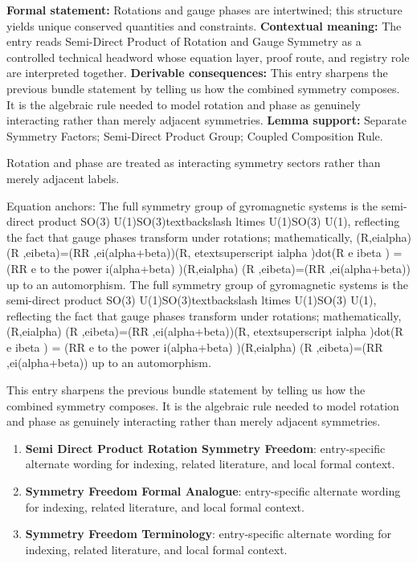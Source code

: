 \begingroup\footnotesize\setlength{\emergencystretch}{3em}\sloppy
\textbf{Formal statement:} Rotations and gauge phases are intertwined; this structure yields unique conserved quantities and constraints. \textbf{Contextual meaning:} The entry reads Semi-Direct Product of Rotation and Gauge Symmetry as a controlled technical headword whose equation layer, proof route, and registry role are interpreted together. \textbf{Derivable consequences:} This entry sharpens the previous bundle statement by telling us how the combined symmetry composes. It is the algebraic rule needed to model rotation and phase as genuinely interacting rather than merely adjacent symmetries. \textbf{Lemma support:} Separate Symmetry Factors; Semi-Direct Product Group; Coupled Composition Rule.\par
\endgroup

Rotation and phase are treated as interacting symmetry sectors rather than merely adjacent labels.

Equation anchors: The full symmetry group of gyromagnetic systems is the semi-direct product SO(3) U(1)SO(3)textbackslash ltimes U(1)SO(3) U(1), reflecting the fact that gauge phases transform under rotations; mathematically, (R,eialpha) (R ,eibeta)=(RR ,ei(alpha+beta))(R, etextsuperscript ialpha )dot(R e ibeta ) = (RR e to the power i(alpha+beta) )(R,eialpha) (R ,eibeta)=(RR ,ei(alpha+beta)) up to an automorphism. The full symmetry group of gyromagnetic systems is the semi-direct product SO(3) U(1)SO(3)textbackslash ltimes U(1)SO(3) U(1), reflecting the fact that gauge phases transform under rotations; mathematically, (R,eialpha) (R ,eibeta)=(RR ,ei(alpha+beta))(R, etextsuperscript ialpha )dot(R e ibeta ) = (RR e to the power i(alpha+beta) )(R,eialpha) (R ,eibeta)=(RR ,ei(alpha+beta)) up to an automorphism.

This entry sharpens the previous bundle statement by telling us how the combined symmetry composes. It is the algebraic rule needed to model rotation and phase as genuinely interacting rather than merely adjacent symmetries.
\endgroup

\begingroup\footnotesize\sloppy
\begin{enumerate}[leftmargin=1.35em,itemsep=1pt,topsep=1pt,parsep=0pt]
\item \textbf{Semi Direct Product Rotation Symmetry Freedom}: entry-specific alternate wording for indexing, related literature, and local formal context.
\item \textbf{Symmetry Freedom Formal Analogue}: entry-specific alternate wording for indexing, related literature, and local formal context.
\item \textbf{Symmetry Freedom Terminology}: entry-specific alternate wording for indexing, related literature, and local formal context.
\end{enumerate}
\endgroup

